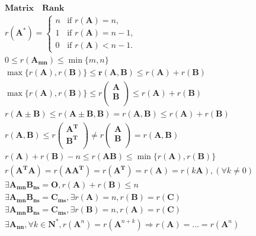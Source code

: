 \documentclass{article}
\begin{document}
\clearpage
\begin{align*}
    \bm{Matrix \quad Rank} \\       
    r(\mathbf{A}^{*}) = \begin{cases} 
            n & \text{if } r(\mathbf{A}) = n,\\
            1 & \text{if } r(\mathbf{A}) = n-1,\\
            0 & \text{if } r(\mathbf{A}) < n-1. 
    \end{cases} \\ 
    0 \le r(\mathbf{A_{mn}}) \le \min\{m, n\} \\
    \max\{r(\mathbf{A}),r(\mathbf{B})\} \le \mathbf{r(\mathbf{A},\mathbf{B})} \le r(\mathbf{A})+r(\mathbf{B}) \\
    \max\{r(\mathbf{A}),r(\mathbf{B})\} \le r\left(
        \begin{array}{c}
            \mathbf{A} \\ 
            \mathbf{B} \\ 
         \end{array} 
    \right) \le r(\mathbf{A})+r(\mathbf{B}) \\   
    r(\mathbf{A}\pm\mathbf{B}) \le r(\mathbf{A}\pm\mathbf{B},\mathbf{B}) = r(\mathbf{A},\mathbf{B}) \le r(\mathbf{A})+r(\mathbf{B}) \\ 
    r(\mathbf{A},\mathbf{B}) \le r\left(
        \begin{array}{c}
            \mathbf{A}^{\mathbf{T}} \\ 
            \mathbf{B}^{\mathbf{T}} \\ 
        \end{array}
    \right) \neq r\left(
        \begin{array}{c}
            \mathbf{A} \\ 
            \mathbf{B} \\ 
        \end{array}
    \right) = r(\mathbf{A},\mathbf{B}) \\ 
    r(\mathbf{A})+r(\mathbf{B})-n \le r(\mathbf{AB}) \le \min\{r(\mathbf{A}),r(\mathbf{B})\} \\
    r(\mathbf{A^{\mathbf{T}}A}) = r(\mathbf{AA^{\mathbf{T}}}) = r(\mathbf{A}^{\mathbf{T}}) = r(\mathbf{A}) = r(k\mathbf{A}),(\forall k \neq 0)\\
    \exists \mathbf{A_{mn}B_{ns}} = \mathbf{O},r(\mathbf{A})+r(\mathbf{B}) \le n \\ 
    \exists \mathbf{A_{mn}B_{ns}} = \mathbf{C_{ms}},\exists r(\mathbf{A})=n, r(\mathbf{B}) = r(\mathbf{C}) \\ 
    \exists \mathbf{A_{mn}B_{ns}} = \mathbf{C_{ms}},\exists r(\mathbf{B})=n, r(\mathbf{A}) = r(\mathbf{C}) \\
    \exists \mathbf{A_{nn}},\forall k \in \mathbf{N^{*}} ,r(\mathbf{A}^{n}) = r(\mathbf{A}^{n+k}) \Longrightarrow  r(\mathbf{A}) = ... =  r(\mathbf{A}^{n}) \\
\end{align*}
\clearpage
\end{document}
